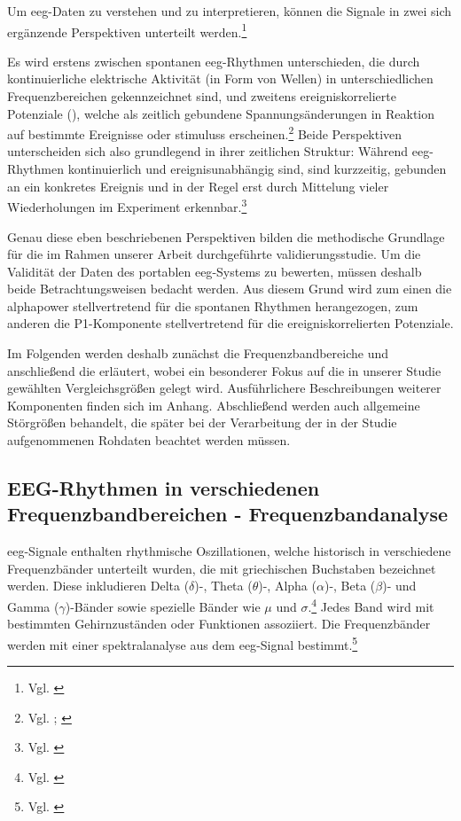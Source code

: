 Um \acrshort{eeg}-Daten zu verstehen und zu interpretieren, können die Signale in zwei sich ergänzende Perspektiven unterteilt werden.\footnote{Vgl. \cite[S.~R82--R83]{biasiucci2019}}

Es wird erstens zwischen spontanen \acrshort{eeg}-Rhythmen unterschieden, die durch kontinuierliche elektrische Aktivität (in Form von Wellen) in unterschiedlichen Frequenzbereichen gekennzeichnet sind, und zweitens ereigniskorrelierte Potenziale (), welche als zeitlich gebundene Spannungsänderungen in Reaktion auf bestimmte Ereignisse oder \glspl{stimulus} erscheinen.\footnote{Vgl. \cite[S.~R82--R83]{biasiucci2019}; \cite[S.~70]{sur2009}} Beide Perspektiven unterscheiden sich also grundlegend in ihrer zeitlichen Struktur: Während \acrshort{eeg}-Rhythmen kontinuierlich und ereignisunabhängig sind, sind  kurzzeitig, gebunden an ein konkretes Ereignis und in der Regel erst durch Mittelung vieler Wiederholungen im Experiment erkennbar.\footnote{Vgl. \cite[S.~R83]{biasiucci2019}}

Genau diese eben beschriebenen Perspektiven bilden die methodische Grundlage für die im Rahmen unserer Arbeit durchgeführte \gls{validierungsstudie}. Um die Validität der Daten des portablen \acrshort{eeg}-Systems zu bewerten, müssen deshalb beide Betrachtungsweisen bedacht werden. Aus diesem Grund wird zum einen die \gls{alphapower} stellvertretend für die spontanen Rhythmen herangezogen, zum anderen die P1-Komponente stellvertretend für die ereigniskorrelierten Potenziale.

Im Folgenden werden deshalb zunächst die Frequenzbandbereiche  und anschließend die   erläutert, wobei ein besonderer Fokus auf die in unserer Studie gewählten Vergleichsgrößen gelegt wird. Ausführlichere Beschreibungen weiterer Komponenten finden sich im Anhang. Abschließend werden auch allgemeine Störgrößen behandelt, die später bei der Verarbeitung der in der Studie aufgenommenen Rohdaten beachtet werden müssen. 

\subsection{EEG-Rhythmen in verschiedenen Frequenzbandbereichen - Frequenzbandanalyse}

\acrshort{eeg}-Signale enthalten rhythmische Oszillationen, welche historisch in verschiedene Frequenzbänder unterteilt wurden, die mit griechischen Buchstaben bezeichnet werden. Diese inkludieren Delta ($\delta$)-, Theta ($\theta$)-, Alpha ($\alpha$)-, Beta ($\beta$)- und Gamma ($\gamma$)-Bänder sowie spezielle Bänder wie $\mu$ und $\sigma$.\footnote{Vgl. \cite{nayak_waveforms}} Jedes Band wird mit bestimmten Gehirnzuständen oder Funktionen assoziiert. Die Frequenzbänder werden mit einer \gls{spektralanalyse} aus dem \acrshort{eeg}-Signal bestimmt.\footnote{Vgl. \cite[S.~R82]{biasiucci2019}}

